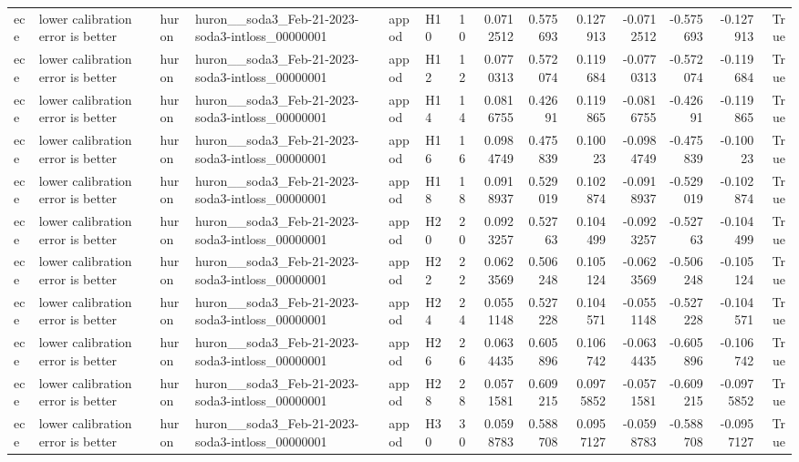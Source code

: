 \begin{longtable}{llllllrrrrrrrr}
ece & lower calibration error is better & huron & huron\_\_soda3\_Feb-21-2023-soda3-intloss\_00000001 & appod & H10 & 10 & 0.0712512 & 0.575693 & 0.127913 & -0.0712512 & -0.575693 & -0.127913 & True \\
ece & lower calibration error is better & huron & huron\_\_soda3\_Feb-21-2023-soda3-intloss\_00000001 & appod & H12 & 12 & 0.0770313 & 0.572074 & 0.119684 & -0.0770313 & -0.572074 & -0.119684 & True \\
ece & lower calibration error is better & huron & huron\_\_soda3\_Feb-21-2023-soda3-intloss\_00000001 & appod & H14 & 14 & 0.0816755 & 0.42691 & 0.119865 & -0.0816755 & -0.42691 & -0.119865 & True \\
ece & lower calibration error is better & huron & huron\_\_soda3\_Feb-21-2023-soda3-intloss\_00000001 & appod & H16 & 16 & 0.0984749 & 0.475839 & 0.10023 & -0.0984749 & -0.475839 & -0.10023 & True \\
ece & lower calibration error is better & huron & huron\_\_soda3\_Feb-21-2023-soda3-intloss\_00000001 & appod & H18 & 18 & 0.0918937 & 0.529019 & 0.102874 & -0.0918937 & -0.529019 & -0.102874 & True \\
ece & lower calibration error is better & huron & huron\_\_soda3\_Feb-21-2023-soda3-intloss\_00000001 & appod & H20 & 20 & 0.0923257 & 0.52763 & 0.104499 & -0.0923257 & -0.52763 & -0.104499 & True \\
ece & lower calibration error is better & huron & huron\_\_soda3\_Feb-21-2023-soda3-intloss\_00000001 & appod & H22 & 22 & 0.0623569 & 0.506248 & 0.105124 & -0.0623569 & -0.506248 & -0.105124 & True \\
ece & lower calibration error is better & huron & huron\_\_soda3\_Feb-21-2023-soda3-intloss\_00000001 & appod & H24 & 24 & 0.0551148 & 0.527228 & 0.104571 & -0.0551148 & -0.527228 & -0.104571 & True \\
ece & lower calibration error is better & huron & huron\_\_soda3\_Feb-21-2023-soda3-intloss\_00000001 & appod & H26 & 26 & 0.0634435 & 0.605896 & 0.106742 & -0.0634435 & -0.605896 & -0.106742 & True \\
ece & lower calibration error is better & huron & huron\_\_soda3\_Feb-21-2023-soda3-intloss\_00000001 & appod & H28 & 28 & 0.0571581 & 0.609215 & 0.0975852 & -0.0571581 & -0.609215 & -0.0975852 & True \\
ece & lower calibration error is better & huron & huron\_\_soda3\_Feb-21-2023-soda3-intloss\_00000001 & appod & H30 & 30 & 0.0598783 & 0.588708 & 0.0957127 & -0.0598783 & -0.588708 & -0.0957127 & True \\

\end{longtable}
